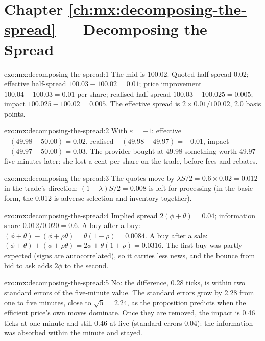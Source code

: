 \section*{Chapter \ref{ch:mx:decomposing-the-spread} --- Decomposing the Spread}

\begin{solution}{exo:mx:decomposing-the-spread:1}
The mid is 100.02. Quoted half-spread 0.02; effective half-spread $100.03-100.02=0.01$; price improvement $100.04-100.03=0.01$ per share; realised
half-spread $100.03-100.025=0.005$; impact $100.025-100.02=0.005$. The effective spread is $2\times0.01/100.02$, 2.0 basis points.
\end{solution}

\begin{solution}{exo:mx:decomposing-the-spread:2}
With $\varepsilon=-1$: effective $-(49.98-50.00)=0.02$, realised $-(49.98-49.97)=-0.01$, impact $-(49.97-50.00)=0.03$. The provider bought at 49.98
something worth 49.97 five minutes later: she lost a cent per share on the trade, before fees and rebates.
\end{solution}

\begin{solution}{exo:mx:decomposing-the-spread:3}
The quotes move by $\lambda S/2=0.6\times0.02=0.012$ in the trade's direction; $(1-\lambda)S/2=0.008$ is left for processing (in the basic form, the
0.012 is adverse selection and inventory together).
\end{solution}

\begin{solution}{exo:mx:decomposing-the-spread:4}
Implied spread $2(\phi+\theta)=0.04$; information share $0.012/0.020=0.6$. A buy after a buy: $(\phi+\theta)-(\phi+\rho\theta)=\theta(1-\rho)=0.0084$. A buy
after a sale: $(\phi+\theta)+(\phi+\rho\theta)=2\phi+\theta(1+\rho)=0.0316$. The first buy was partly expected (signs are autocorrelated), so it carries less
news, and the bounce from bid to ask adds $2\phi$ to the second.
\end{solution}

\begin{solution}{exo:mx:decomposing-the-spread:5}
No: the difference, 0.28 ticks, is within two standard errors of the five-minute value. The standard errors grow by 2.28 from one to five minutes, close
to $\sqrt5=2.24$, as the proposition predicts when the efficient price's own moves dominate. Once they are removed, the impact is 0.46 ticks at one
minute and still 0.46 at five (standard errors 0.04): the information was absorbed within the minute and stayed.
\end{solution}

